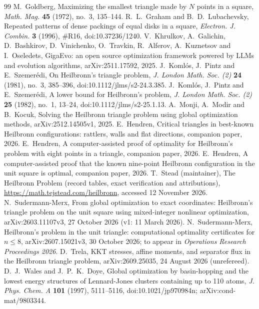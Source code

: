 \documentclass[11pt]{amsart}
\theoremstyle{definition}
\begin{document}
\begin{thebibliography}{99}
 M.~Goldberg, Maximizing the smallest triangle made by $N$ points in a square, \emph{Math. Mag.} \textbf{45} (1972), no.~3, 135--144.
 R.~L.~Graham and B.~D.~Lubachevsky, Repeated patterns of dense packings of equal disks in a square, \emph{Electron. J. Combin.} \textbf{3} (1996), \#R16, doi:10.37236/1240.
 V.~Khrulkov, A.~Galichin, D.~Bashkirov, D.~Vinichenko, O.~Travkin, R.~Alferov, A.~Kuznetsov and I.~Oseledets, GigaEvo: an open source optimization framework powered by LLMs and evolution algorithms, arXiv:2511.17592, 2025.
 J.~Koml\'os, J.~Pintz and E.~Szemer\'edi, On Heilbronn's triangle problem, \emph{J. London Math. Soc. (2)} \textbf{24} (1981), no.~3, 385--396, doi:10.1112/jlms/s2-24.3.385.
 J.~Koml\'os, J.~Pintz and E.~Szemer\'edi, A lower bound for Heilbronn's problem, \emph{J. London Math. Soc. (2)} \textbf{25} (1982), no.~1, 13--24, doi:10.1112/jlms/s2-25.1.13.
 A.~Monji, A.~Modir and B.~Kocuk, Solving the Heilbronn triangle problem using global optimization methods, arXiv:2512.14505v1, 2025.
 E.~Hendren, Critical triangles in best-known Heilbronn configurations: rattlers, walls and flat directions, companion paper, 2026.
 E.~Hendren, A computer-assisted proof of optimality for Heilbronn's problem with eight points in a triangle, companion paper, 2026.
 E.~Hendren, A computer-assisted proof that the known nine-point Heilbronn configuration in the unit square is optimal, companion paper, 2026.
 T.~Stead (maintainer), The Heilbronn Problem (record tables, exact verification and attributions), \url{https://math.tejstead.com/heilbronn}, accessed 12 November 2026.
 N.~Sudermann-Merx, From global optimization to exact coordinates: Heilbronn's triangle problem on the unit square using mixed-integer nonlinear optimization, arXiv:2603.11107v3, 27 October 2026 (v1: 11 March 2026).
 N.~Sudermann-Merx, Heilbronn's problem in the unit triangle: computational optimality certificates for $n \le 8$, arXiv:2607.15021v3, 30 October 2026; to appear in \emph{Operations Research Proceedings 2026}.
 D.~Trela, KKT stresses, affine moments, and separator flux in the Heilbronn triangle problem, arXiv:2609.25035, 24 August 2026 (unrefereed).
 D.~J.~Wales and J.~P.~K.~Doye, Global optimization by basin-hopping and the lowest energy structures of Lennard-Jones clusters containing up to 110 atoms, \emph{J. Phys. Chem. A} \textbf{101} (1997), 5111--5116, doi:10.1021/jp970984n; arXiv:cond-mat/9803344.

\end{thebibliography}
\end{document}
